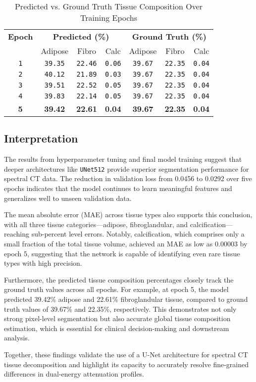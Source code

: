 \begin{table}[h!]
\centering
\caption{Predicted vs. Ground Truth Tissue Composition Over Training Epochs}
\label{tab:tissue_prediction}
\begin{tabular}{|c|ccc|ccc|}
\hline
\textbf{Epoch} & \multicolumn{3}{c|}{\textbf{Predicted (\%)}} & \multicolumn{3}{c|}{\textbf{Ground Truth (\%)}} \\
               & Adipose & Fibro & Calc & Adipose & Fibro & Calc \\
\hline
\texttt{1} & \texttt{39.35} & \texttt{22.46} & \texttt{0.06} & \texttt{39.67} & \texttt{22.35} & \texttt{0.04} \\
\texttt{2} & \texttt{40.12} & \texttt{21.89} & \texttt{0.03} & \texttt{39.67} & \texttt{22.35} & \texttt{0.04} \\
\texttt{3} & \texttt{39.51} & \texttt{22.52} & \texttt{0.05} & \texttt{39.67} & \texttt{22.35} & \texttt{0.04} \\
\texttt{4} & \texttt{39.83} & \texttt{22.14} & \texttt{0.05} & \texttt{39.67} & \texttt{22.35} & \texttt{0.04} \\
\textbf{5} & \textbf{39.42} & \textbf{22.61} & \textbf{0.04} & \textbf{39.67} & \textbf{22.35} & \textbf{0.04} \\
\hline
\end{tabular}
\end{table}

\subsection{Interpretation}

The results from hyperparameter tuning and final model training suggest that deeper architectures like \texttt{UNet512} 
provide superior segmentation performance for spectral CT data. The reduction in validation loss from 0.0456 to 0.0292 
over five epochs indicates that the model continues to learn meaningful features and generalizes well to unseen validation 
data.

The mean absolute error (MAE) across tissue types also supports this conclusion, with all three tissue categories—adipose, 
fibroglandular, and calcification—reaching sub-percent level errors. Notably, calcification, which comprises only a small 
fraction of the total tissue volume, achieved an MAE as low as 0.00003 by epoch 5, suggesting that the network is capable 
of identifying even rare tissue types with high precision.

Furthermore, the predicted tissue composition percentages closely track the ground truth values across all epochs. For 
example, at epoch 5, the model predicted 39.42\% adipose and 22.61\% fibroglandular tissue, compared to ground truth 
values of 39.67\% and 22.35\%, respectively. This demonstrates not only strong pixel-level segmentation but also accurate 
global tissue composition estimation, which is essential for clinical decision-making and downstream analysis.

Together, these findings validate the use of a U-Net architecture for spectral CT tissue decomposition 
and highlight its capacity to accurately resolve fine-grained differences in dual-energy attenuation profiles.
